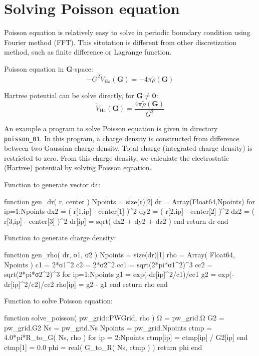 \section{Solving Poisson equation}

Poisson equation is relatively easy to solve in periodic
boundary condition using Fourier method (FFT). This situtation is different
from other discretization method, such as finite difference or Lagrange
function.

Poisson equation in $\mathbf{G}$-space:
\begin{equation}
-G^2 \tilde{V}_{\mathrm{Ha}}(\mathbf{G}) = -4\pi \tilde{\rho}(\mathbf{G})
\end{equation}

Hartree potential can be solve directly, for $\mathbf{G} \neq \mathbf{0}$:
\begin{equation}
\tilde{V}_{\mathrm{Ha}}(\mathbf{G}) = \frac{4\pi\tilde{\rho}(\mathbf{G})}{G^2}
\end{equation}

An example a program to solve Poisson equation is given in directory
{\tt poisson\_01}. In this program, a charge density is constructed
from difference between two Gaussian charge density. Total charge
(integrated charge density) is restricted to zero.
From this charge density, we calculate the electrostatic (Hartree) potential
by solving Poisson equation.

Function to generate vector {\tt dr}:

\begin{juliacode}
function gen_dr( r, center )
  Npoints = size(r)[2]
  dr = Array(Float64,Npoints)
  for ip=1:Npoints
    dx2 = ( r[1,ip] - center[1] )^2
    dy2 = ( r[2,ip] - center[2] )^2
    dz2 = ( r[3,ip] - center[3] )^2
    dr[ip] = sqrt( dx2 + dy2 + dz2 )
  end
  return dr
end
\end{juliacode}


Function to generate charge density:

\begin{juliacode}
function gen_rho( dr, σ1, σ2 )
  Npoints = size(dr)[1]
  rho = Array( Float64, Npoints )
  c1 = 2*σ1^2
  c2 = 2*σ2^2
  cc1 = sqrt(2*pi*σ1^2)^3
  cc2 = sqrt(2*pi*σ2^2)^3
  for ip=1:Npoints
    g1 = exp(-dr[ip]^2/c1)/cc1
    g2 = exp(-dr[ip]^2/c2)/cc2
    rho[ip] = g2 - g1
  end
  return rho
end
\end{juliacode}

Function to solve Poisson equation:

\begin{juliacode}
function solve_poisson( pw_grid::PWGrid, rho )
  Ω  = pw_grid.Ω
  G2 = pw_grid.G2
  Ns = pw_grid.Ns
  Npoints = pw_grid.Npoints
  ctmp = 4.0*pi*R_to_G( Ns, rho )
  for ip = 2:Npoints
    ctmp[ip] = ctmp[ip] / G2[ip]
  end
  ctmp[1] = 0.0
  phi = real( G_to_R( Ns, ctmp ) )
  return phi
end
\end{juliacode}
